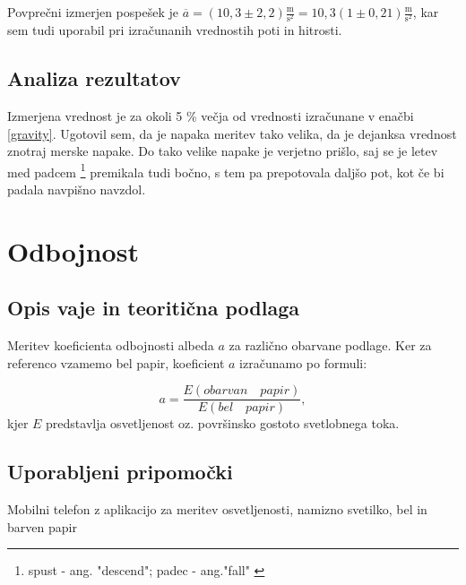 \documentclass[12pt]{article}
\begin{document}
	Povprečni izmerjen pospešek je $\overline{a} = (10,3 \pm 2,2) \frac{\text{m}}{\text{s}^2} = 10,3 (1 \pm 0,21) \frac{\text{m}}{\text{s}^2}$, kar
	sem tudi uporabil pri izračunanih vrednostih poti in hitrosti.
 	\subsection*{Analiza rezultatov}
	Izmerjena vrednost je za okoli 5 \% večja od vrednosti izračunane v enačbi \eqref{gravity}.
	Ugotovil sem, da je napaka meritev tako velika, da je dejanksa vrednost znotraj merske
	napake. Do tako velike napake je verjetno prišlo, saj se je letev med padcem 
	\footnote{spust - ang. "descend"; padec - ang."fall" \cite{fallvsdescent}}
	premikala tudi bočno, s tem pa prepotovala daljšo pot, kot če bi padala navpišno navzdol.

\newpage
\section{Odbojnost}
	\subsection*{Opis vaje in teoritična podlaga}
	Meritev koeficienta odbojnosti albeda $a$ za različno obarvane podlage. Ker za referenco
	vzamemo bel papir, koeficient $a$ izračunamo po formuli:

	\begin{equation}
		a = \frac{E(obarvan \quad papir)}{E(bel \quad papir)},
	\end{equation}
	kjer $E$ predstavlja osvetljenost oz. površinsko gostoto svetlobnega toka. 
	\subsection*{Uporabljeni pripomočki}
	Mobilni telefon z aplikacijo za meritev osvetljenosti, namizno svetilko, bel in barven
	papir
\end{document}
